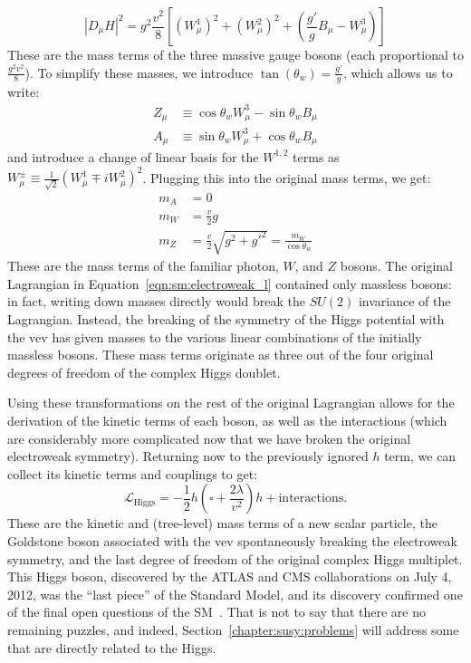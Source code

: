 %
\begin{equation}
|D_\mu H|^2 = g^2 \frac{v^2}{8} \left[ (W_\mu^1)^2 + (W_\mu^2)^2 + \left( \frac{g'}{g} B_\mu - W_\mu^3 \right) \right]
\end{equation}
%
These are the mass terms of the three massive gauge bosons (each proportional to $\frac{g^2 v^2}{8}$). To simplify these masses, we introduce $\tan(\theta_w) = \frac{g'}{g}$, which allows us to write:
%
\begin{align}
Z_\mu &\equiv \cos \theta_w W_\mu^3 - \sin \theta_w B_\mu\\
A_\mu &\equiv \sin \theta_w W_\mu^3 + \cos \theta_w B_\mu
\end{align}
%
and introduce a change of linear basis for the $W^{1,2}$ terms as $W_\mu^{\pm} \equiv \frac{1}{\sqrt{2}} (W_\mu^1 \mp i W_\mu^2)^2$. Plugging this into the original mass terms, we get:
%
\begin{align}
m_A &= 0\\
m_W &= \frac{v}{2} g\\
m_Z &= \frac{v}{2} \sqrt{g^2 +g'^2} = \frac{m_W}{\cos \theta_w}
\end{align}
%
These are the mass terms of the familiar photon, $W$, and $Z$ bosons. The original Lagrangian in Equation~\ref{eqn:sm:electroweak_l} contained only massless bosons: in fact, writing down masses directly would break the $SU(2)$ invariance of the Lagrangian. Instead, the breaking of the symmetry of the Higgs potential with the vev has given masses to the various linear combinations of the initially massless bosons. These mass terms originate as three out of the four original degrees of freedom of the complex Higgs doublet. 

Using these transformations on the rest of the original Lagrangian allows for the derivation of the kinetic terms of each boson, as well as the interactions (which are considerably more complicated now that we have broken the original electroweak symmetry). Returning now to the previously ignored $h$ term, we can collect its kinetic terms and couplings to get:
%
\begin{equation}
\mathcal{L}_\mathrm{Higgs} = - \frac{1}{2} h \left(\square + \frac{2\lambda}{v^2}\right) h + \mathrm{interactions}.
\end{equation}
%
These are the kinetic and (tree-level) mass terms of a new scalar particle, the Goldstone boson associated with the vev spontaneously breaking the electroweak symmetry, and the last degree of freedom of the original complex Higgs multiplet. This Higgs boson, discovered by the ATLAS and CMS collaborations on July 4, 2012, was the ``last piece'' of the Standard Model, and its discovery confirmed one of the final open questions of the SM~\cite{Aad:2012tfa,Chatrchyan:2012ufa}. That is not to say that there are no remaining puzzles, and indeed, Section~\ref{chapter:susy:problems} will address some that are directly related to the Higgs.


